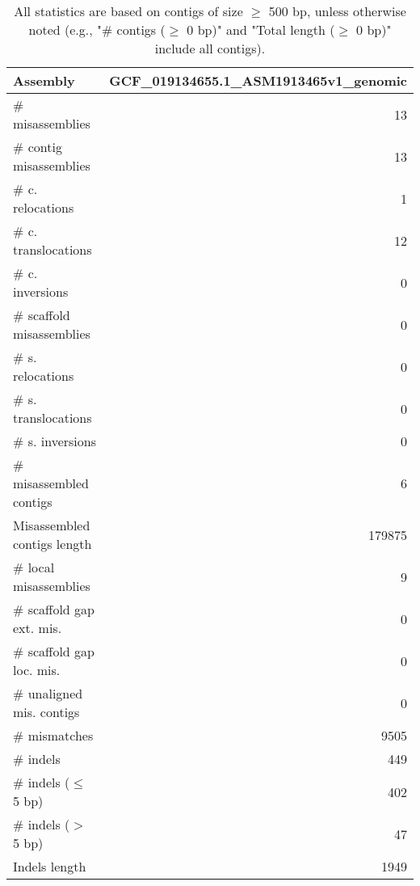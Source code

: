 \documentclass[12pt,a4paper]{article}
\begin{document}
\begin{table}[ht]
\begin{center}
\caption{All statistics are based on contigs of size $\geq$ 500 bp, unless otherwise noted (e.g., "\# contigs ($\geq$ 0 bp)" and "Total length ($\geq$ 0 bp)" include all contigs).}
\begin{tabular}{|l*{1}{|r}|}
\hline
Assembly & GCF\_019134655.1\_ASM1913465v1\_genomic \\ \hline
\# misassemblies & 13 \\ \hline
\hspace{2mm}\# contig misassemblies & 13 \\ \hline
\hspace{5mm}\# c. relocations & 1 \\ \hline
\hspace{5mm}\# c. translocations & 12 \\ \hline
\hspace{5mm}\# c. inversions & 0 \\ \hline
\hspace{2mm}\# scaffold misassemblies & 0 \\ \hline
\hspace{5mm}\# s. relocations & 0 \\ \hline
\hspace{5mm}\# s. translocations & 0 \\ \hline
\hspace{5mm}\# s. inversions & 0 \\ \hline
\# misassembled contigs & 6 \\ \hline
Misassembled contigs length & 179875 \\ \hline
\# local misassemblies & 9 \\ \hline
\# scaffold gap ext. mis. & 0 \\ \hline
\# scaffold gap loc. mis. & 0 \\ \hline
\# unaligned mis. contigs & 0 \\ \hline
\# mismatches & 9505 \\ \hline
\# indels & 449 \\ \hline
\hspace{5mm}\# indels ($\leq$ 5 bp) & 402 \\ \hline
\hspace{5mm}\# indels ($>$ 5 bp) & 47 \\ \hline
Indels length & 1949 \\ \hline
\end{tabular}
\end{center}
\end{table}
\end{document}
